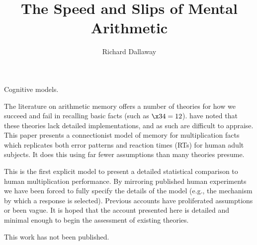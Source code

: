 



\title{The Speed and Slips of Mental Arithmetic}
\date{}
\author{Richard Dallaway}
\maketitle

 Cognitive models.

 The literature on arithmetic memory offers a number of
theories for how we succeed and fail in recalling basic facts (such as
$\x34=12$).  have noted that these theories lack detailed
implementations, and as such are difficult to appraise.  This paper
presents a connectionist model of memory for multiplication facts which
replicates both error patterns and reaction times (RTs) for human adult
subjects. It does this using far fewer assumptions than many theories
presume.

This is the first explicit model to present a detailed statistical
comparison to human multiplication performance.  By mirroring published
human experiments we have been forced to fully specify the details of the
model (e.g., the mechanism by which a response is selected). Previous
accounts have proliferated assumptions or been vague. It is hoped that the
account presented here is detailed and minimal enough to begin the
assessment of existing theories.\medskip

 This work has not been published.


